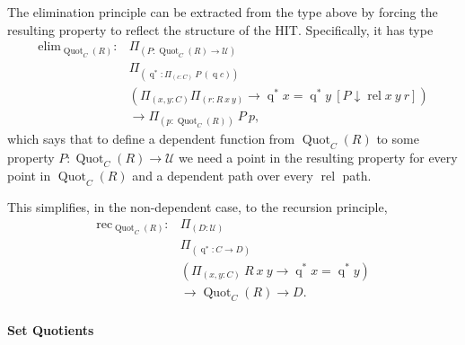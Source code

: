 \documentclass[12pt, parskip, DIV=14]{scrbook}
\newcommand{\Quot}{\operatorname{Quot}_C(R)}
\newcommand{\q}{\operatorname{q}}
\newcommand{\rel}{\operatorname{rel}}
\newcommand{\qs}{\operatorname{q}^*}
\begin{document}
The elimination principle can be extracted from the type above by forcing the resulting property to reflect the structure of the HIT. Specifically, it has type
$$
\begin{array}{rl}
  \mathrm{elim}_{\Quot} :& \Pi_{(P : \Quot \to \mathcal{U})} \\ &\Pi_{(\qs : \Pi_{(c :C)}~P~(\q c))} \\ & (\Pi_{(x , y : C)}\Pi_{(r : R~x~y)} \to \qs x = \qs y~[P \downarrow \rel x~y~r]) \\ &\to \Pi_{(p : \Quot)}~P~p,
\end{array}
$$
which says that to define a dependent function from $\Quot$ to some property $P : \Quot \to \mathcal{U}$ we need a point in the resulting property for every point in $\Quot$ and a dependent path over every $\rel$ path.

This simplifies, in the non-dependent case, to the recursion principle,
$$
\begin{array}{rl}
  \mathrm{rec}_{\Quot} :& \Pi_{(D : \mathcal{U})} \\ &\Pi_{(\qs : C \to D)} \\ & (\Pi_{(x , y : C)}~R~x~y \to \qs x = \qs y) \\ &\to \Quot \to D.
\end{array}
$$

\paragraph{Set Quotients}
\end{document}
